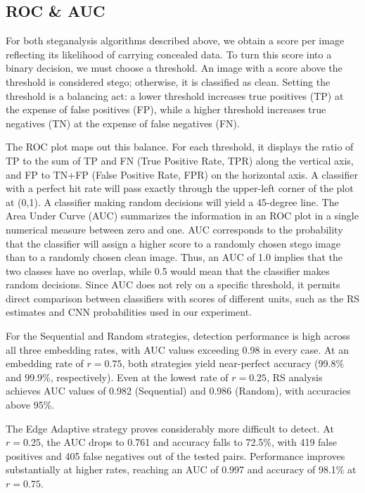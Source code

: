 \subsection{ROC \& AUC}
For both steganalysis algorithms described above, we obtain a score per image reflecting its likelihood of carrying concealed data. 
To turn this score into a binary decision, we must choose a threshold. An image with a score above the threshold is considered stego; otherwise, it is classified as clean. 
Setting the threshold is a balancing act: a lower threshold increases true positives (TP) at the expense of false positives (FP), while a higher threshold increases true negatives (TN) at the expense of false negatives (FN).

The ROC plot maps out this balance. For each threshold, it displays the ratio of TP to the sum of TP and FN (True Positive Rate, TPR) along the vertical axis, and FP to TN+FP (False Positive Rate, FPR) on the horizontal axis. 
A classifier with a perfect hit rate will pass exactly through the upper-left corner of the plot at (0,1). 
A classifier making random decisions will yield a 45-degree line. The Area Under Curve (AUC) summarizes the information in an ROC plot in a single numerical measure between zero and one. 
AUC corresponds to the probability that the classifier will assign a higher score to a randomly chosen stego image than to a randomly chosen clean image. 
Thus, an AUC of 1.0 implies that the two classes have no overlap, while 0.5 would mean that the classifier makes random decisions. Since AUC does not rely on a specific threshold, it permits direct comparison between classifiers with scores of different units, such as the RS estimates and CNN probabilities used in our experiment.

For the Sequential and Random strategies, detection performance is high across all three embedding rates, with AUC values exceeding 0.98 in every case. 
At an embedding rate of $r = 0.75$, both strategies yield near-perfect accuracy (99.8\% and 99.9\%, respectively). 
Even at the lowest rate of $r = 0.25$, RS analysis achieves AUC values of 0.982 (Sequential) and 0.986 (Random), with accuracies above 95\%. 

The Edge Adaptive strategy proves considerably more difficult to detect. 
At $r = 0.25$, the AUC drops to 0.761 and accuracy falls to 72.5\%, with 419 false positives and 405 false negatives out of the tested pairs. 
Performance improves substantially at higher rates, reaching an AUC of 0.997 and accuracy of 98.1\% at $r = 0.75$. 

